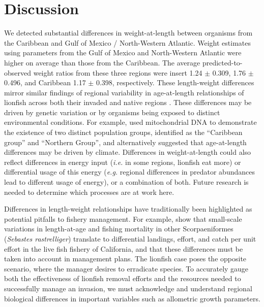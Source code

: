 \documentclass[fleqn,10pt,lineno]{wlpeerj} %
\begin{document}
\clearpage

\section*{Discussion}

We detected substantial differences in weight-at-length between
organisms from the Caribbean and Gulf of Mexico / North-Western
Atlantic. Weight estimates using parameters from the Gulf of Mexico and
North-Western Atlantic were higher on average than those from the
Caribbean. The average predicted-to-observed weight ratios from these
three regions were insert 1.24 \(\pm\) 0.309, 1.76 \(\pm\) 0.496, and
Caribbean 1.17 \(\pm\) 0.398, respectively. These length-weight
differences mirror similar findings of regional variability in
age-at-length relationships of lionfish across both their invaded and
native regions \citep{pusack_2016}. These differences may be driven by
genetic variation or by organisms being exposed to distinct
environmental conditions. For example, \citet{betancurr_2011} used
mitochondrial DNA to demonstrate the existence of two distinct
population groups, identified as the ``Caribbean group'' and ``Northern
Group'', and \citet{fogg_2015} alternatively suggested that
age-at-length differences may be driven by climate. Differences in
weight-at-length could also reflect differences in energy input
(\emph{i.e.} in some regions, lionfish eat more) or differential usage
of this energy (\emph{e.g.} regional differences in predator abundances
lead to different usage of energy), or a combination of both. Future
research is needed to determine which processes are at work here.

Differences in length-weight relationships have traditionally been
highlighted as potential pitfalls to fishery management. For example,
\citet{wilson_2012} show that small-scale variations in length-at-age
and fishing mortality in other Scorpaeniformes (\emph{Sebastes
rastrelliger}) translate to differential landings, effort, and catch per
unit effort in the live fish fishery of California, and that these
differences must be taken into account in management plans. The lionfish
case poses the opposite scenario, where the manager desires to
erradicate species. To accurately gauge both the effectiveness of
lionfish removal efforts and the resources needed to successfully manage
an invasion, we must acknowledge and understand regional biological
differences in important variables such as allometric growth parameters.
\end{document}
